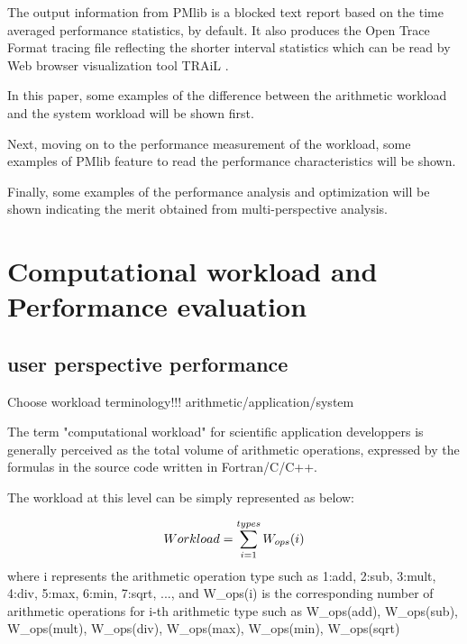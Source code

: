 \documentclass[conference]{IEEEtran}
\begin{document}
The output information from PMlib is a blocked text report based on
the time averaged performance statistics, by default.
It also produces the Open Trace Format \cite{} tracing file reflecting
the shorter interval statistics which can be read by Web browser
visualization tool TRAiL \cite{}.

In this paper, some examples of the difference between
the arithmetic workload and the system workload will be shown first.

Next, moving on to the performance measurement of the workload,
some examples of PMlib feature to read the performance characteristics
will be shown.

Finally, some examples of the performance analysis and optimization
will be shown indicating the merit obtained from 
multi-perspective analysis.



\section{Computational workload and Performance evaluation}
\subsection{user perspective performance}

{\color{blue} Choose workload terminology!!! arithmetic/application/system}

The term "computational workload" for scientific application developpers
is generally perceived as the total volume of arithmetic operations,
expressed by the formulas in the source code written in Fortran/C/C++.

The workload at this level can be simply represented as below:

\begin{equation}
		Workload = \sum_{i=1}^{types} W_{ops}(i) \\
\end{equation}
where i represents the arithmetic operation type such as
1:add, 2:sub, 3:mult, 4:div, 5:max, 6:min, 7:sqrt, ...,
and W\_ops(i) is the corresponding number of arithmetic operations for i-th
arithmetic type such as
W\_ops(add),
W\_ops(sub),
W\_ops(mult),
W\_ops(div),
W\_ops(max),
W\_ops(min),
W\_ops(sqrt)
\end{document}

